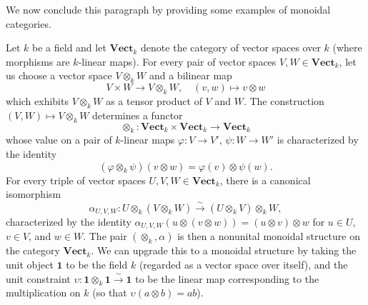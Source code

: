 We now conclude this paragraph by providing some examples of monoidal categories.
\begin{example}\label{monoidal cat Vect_k construction}
Let $k$ be a field and let $\mathbf{Vect}_k$ denote the category of vector spaces over $k$ (where morphisms are $k$-linear maps). For every pair of vector spaces $V,W\in\mathbf{Vect}_k$, let us choose a vector space $V\otimes_kW$ and a bilinear map
\[V\times W\to V\otimes_kW,\quad (v,w)\mapsto v\otimes w\]
which exhibits $V\otimes_kW$ as a tensor product of $V$ and $W$. The construction $(V,W)\mapsto V\otimes_kW$ determines a functor
\[\otimes_k:\mathbf{Vect}_k\times\mathbf{Vect}_k\to\mathbf{Vect}_k\]
whose value on a pair of $k$-linear maps $\varphi:V\to V'$, $\psi:W\to W'$ is characterized by the identity
\[(\varphi\otimes_k\psi)(v\otimes w)=\varphi(v)\otimes\psi(w).\]
For every triple of vector spaces $U,V,W\in\mathbf{Vect}_k$, there is a canonical isomorphism
\[\alpha_{U,V,W}:U\otimes_k(V\otimes_kW)\stackrel{\sim}{\to}(U\otimes_kV)\otimes_kW,\]
characterized by the identity $\alpha_{U,V,W}(u\otimes(v\otimes w))=(u\otimes v)\otimes w$ for $u\in U$, $v\in V$, and $w\in W$. The pair $(\otimes_k,\alpha)$ is then a nonunital monoidal structure on the category $\mathbf{Vect}_k$. We can upgrade this to a monoidal structure by taking the unit object $\mathbf{1}$ to be the field $k$ (regarded as a vector space over itself), and the unit constraint $\upsilon:\mathbf{1}\otimes_k\mathbf{1}\stackrel{\sim}{\to}\mathbf{1}$ to be the linear map corresponding to the multiplication on $k$ (so that $\upsilon(a\otimes b)=ab$).
\end{example}

